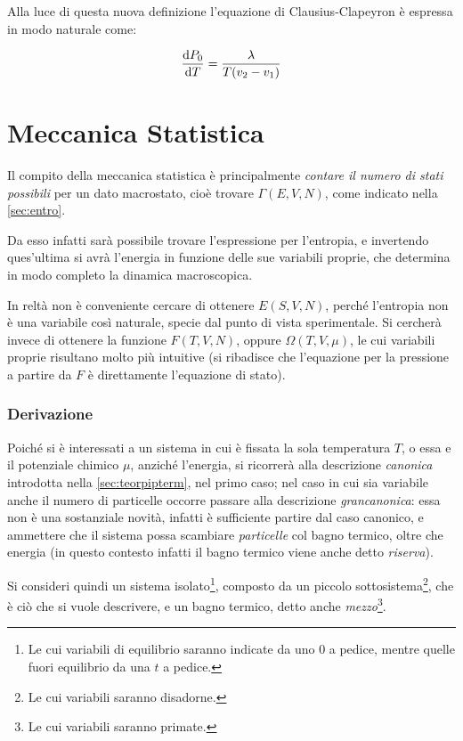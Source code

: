 Alla luce di questa nuova definizione l'equazione di Clausius-Clapeyron è espressa in modo naturale come:

\begin{equation*}
\derivative{ P_0}{T} = \frac{\lambda}{T(v_2 - v_1)}
\end{equation*}

\section{Meccanica Statistica}
\label{sec:statmech}

Il compito della meccanica statistica è principalmente \textit{contare il numero di stati possibili} per un dato macrostato, cioè trovare $\Gamma(E,V,N)$, come indicato nella \cref{sec:entro}.

Da esso infatti sarà possibile trovare l'espressione per l'entropia, e invertendo ques'ultima si avrà l'energia in funzione delle sue variabili proprie, che determina in modo completo la dinamica macroscopica.

In reltà non è conveniente cercare di ottenere $E(S,V,N)$, perché l'entropia non è una variabile così naturale, specie dal punto di vista sperimentale. Si cercherà invece di ottenere la funzione $ F(T,V,N) $, oppure $ \Omega(T,V,\mu) $, le cui variabili proprie risultano molto più intuitive (si ribadisce che l'equazione per la pressione a partire da $ F $ è direttamente l'equazione di stato).

\subsubsection{Derivazione}
Poiché si è interessati a un sistema in cui è fissata la sola temperatura $ T $, o essa e il potenziale chimico $ \mu $, anziché l'energia, si ricorrerà alla descrizione \textit{canonica} introdotta nella \cref{sec:teorpipterm}, nel primo caso; nel caso in cui sia variabile anche il numero di particelle occorre passare alla descrizione \textit{grancanonica}: essa non è una sostanziale novità, infatti è sufficiente partire dal caso canonico, e ammettere che il sistema possa scambiare \textit{particelle} col bagno termico, oltre che energia (in questo contesto infatti il bagno termico viene anche detto \textit{riserva}).
\newline

Si consideri quindi un sistema isolato\footnote{Le cui variabili di equilibrio saranno indicate da uno $0$ a pedice, mentre quelle fuori equilibrio da una $t$ a pedice.}, composto da un piccolo sottosistema\footnote{Le cui variabili saranno disadorne.}, che è ciò che si vuole descrivere, e un bagno termico, detto anche \textit{mezzo}\footnote{Le cui variabili saranno primate.}.
\newline

